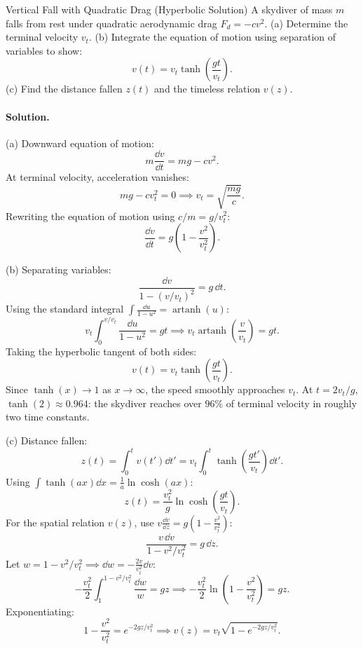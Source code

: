 \begin{workedexample}{Vertical Fall with Quadratic Drag (Hyperbolic Solution)}
A skydiver of mass $m$ falls from rest under quadratic aerodynamic drag $F_d = -c v^2$.
(a) Determine the terminal velocity $v_t$.
(b) Integrate the equation of motion using separation of variables to show:
\[
v(t) = v_t\tanh\left(\frac{gt}{v_t}\right).
\]
(c) Find the distance fallen $z(t)$ and the timeless relation $v(z)$.

\paragraph{Solution.}

(a) Downward equation of motion:
\[
m\frac{\dd v}{\dd t} = mg - cv^2.
\]
At terminal velocity, acceleration vanishes:
\[
mg - cv_t^2 = 0 \implies \boxed{v_t = \sqrt{\frac{mg}{c}}.}
\]
Rewriting the equation of motion using $c/m = g/v_t^2$:
\[
\frac{\dd v}{\dd t} = g\left(1 - \frac{v^2}{v_t^2}\right).
\]

(b) Separating variables:
\[
\frac{\dd v}{1 - (v/v_t)^2} = g\,\dd t.
\]
Using the standard integral $\int \frac{\dd u}{1 - u^2} = \operatorname{artanh}(u)$:
\[
v_t\int_0^{v/v_t} \frac{\dd u}{1 - u^2} = gt \implies v_t\operatorname{artanh}\left(\frac{v}{v_t}\right) = gt.
\]
Taking the hyperbolic tangent of both sides:
\[
\boxed{v(t) = v_t\tanh\left(\frac{gt}{v_t}\right).}
\]
Since $\tanh(x) \to 1$ as $x \to \infty$, the speed smoothly approaches $v_t$. At $t = 2v_t/g$, $\tanh(2) \approx 0.964$: the skydiver reaches over $96\%$ of terminal velocity in roughly two time constants.

(c) Distance fallen:
\[
z(t) = \int_0^t v(t')\dd t' = v_t\int_0^t \tanh\left(\frac{gt'}{v_t}\right)\dd t'.
\]
Using $\int \tanh(ax)\dd x = \frac{1}{a}\ln\cosh(ax)$:
\[
\boxed{z(t) = \frac{v_t^2}{g}\ln\cosh\left(\frac{gt}{v_t}\right).}
\]
For the spatial relation $v(z)$, use $v\frac{\dd v}{\dd z} = g\left(1 - \frac{v^2}{v_t^2}\right)$:
\[
\frac{v\,\dd v}{1 - v^2/v_t^2} = g\,\dd z.
\]
Let $w = 1 - v^2/v_t^2 \implies \dd w = -\frac{2v}{v_t^2}\dd v$:
\[
-\frac{v_t^2}{2}\int_1^{1 - v^2/v_t^2} \frac{\dd w}{w} = gz \implies -\frac{v_t^2}{2}\ln\left(1 - \frac{v^2}{v_t^2}\right) = gz.
\]
Exponentiating:
\[
1 - \frac{v^2}{v_t^2} = e^{-2gz/v_t^2} \implies \boxed{v(z) = v_t\sqrt{1 - e^{-2gz/v_t^2}}.}
\]
\end{workedexample}

